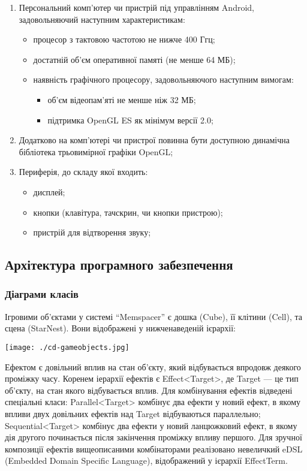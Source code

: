 \begin{enumerate}
  \item Персональний комп'ютер чи пристрій під управлінням Android, задовольняючий наступним характеристикам:
  \begin{itemize}
    \item процесор з тактовою частотою не нижче 400 Ггц;
    \item достатній об'єм оперативної памяті (не менше 64 МБ);
    \item наявність графічного процесору, задовольняючого наступним вимогам:
    \begin{itemize}
      \item об'єм відеопам'яті не менше ніж 32 МБ;
      \item підтримка OpenGL ES як мінімум версії 2.0;
    \end{itemize}
  \end{itemize}
  \item Додатково на комп'ютері чи пристрої повинна бути доступною динамічна бібліотека трьовимірної графіки OpenGL;
  \item Периферія, до складу якої входить:
  \begin{itemize}
    \item дисплей;
    \item кнопки (клавітура, тачскрин, чи кнопки пристрою);
    \item пристрій для відтворення звуку;
  \end{itemize}
\end{enumerate}

\subsection{Архітектура програмного забезпечення}

\subsubsection{Діаграми класів}

Ігровими об'єктами у системі ``Memspacer'' є дошка (Cube), її клітини (Cell), та сцена (StarNest). Вони відображені у нижченаведеній ієрархії:

\begin{center}
  \texttt{[image: ./cd-gameobjects.jpg]}
\end{center}

Ефектом є довільний вплив на стан об'єкту, який відбувається впродовж деякого проміжку часу. Коренем іерархії ефектів є Effect<Target>, де Target — це тип об'єкту, на стан якого відбувається вплив.
Для комбінування ефектів відведені спеціальні класи:
Parallel<Target> комбінує два ефекти у новий ефект, в якому впливи двух довільних ефектів над Target відбуваються параллельно;
Sequential<Target> комбінує два ефекти у новий ланцюжковий ефект, в якому дія другого починається після закінчення проміжку впливу першого.
	Для зручної композиції ефектів вищеописаними комбінаторами реалізовано невеличкий eDSL (Embedded Domain Specific Language), відображений у ієрархії EffectTerm.

